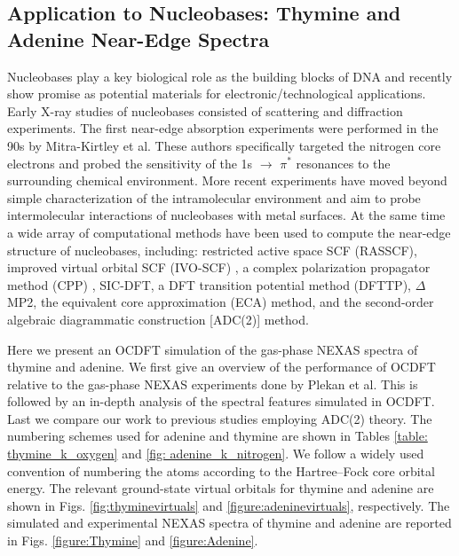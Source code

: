 \documentclass[12pt]{article}
\begin{document}
\subsection{Application to Nucleobases: Thymine and Adenine Near-Edge Spectra}
Nucleobases play a key biological role as the building blocks of DNA and recently show promise as potential materials for electronic/technological applications. \cite{di_mauro_dna_1993,niemeyer_dna_1997,niemeyer_nanoparticles_2001,song_nucleobase_2012} Early X-ray studies of nucleobases consisted of scattering and diffraction experiments.\cite{langridge_x-ray_1964,sundaralingam_structure_1975,camerman_photodimer_1968,davies_x-ray_1967} The first near-edge absorption experiments were performed in the 90s by Mitra-Kirtley et al.\cite{kirtley_nitrogen_1992} These authors specifically targeted the nitrogen  core electrons and probed the sensitivity of the 1s $\rightarrow$ $\pi^*$ resonances to the surrounding chemical environment. More recent experiments have moved beyond simple characterization of the intramolecular environment and aim to probe intermolecular interactions of nucleobases with metal surfaces.\cite{seifert_molecular_2007,yamada_adsorption_2004,fujii_x-ray_2003,fujii_near-edge_2004}  At the same time a wide array of computational methods have been used to compute the near-edge structure of nucleobases, including: restricted active space SCF (RASSCF),\cite{mochizuki_hf-stex_2001} improved virtual orbital SCF (IVO-SCF) \cite{macnaughton_electronic_2005}, a complex polarization propagator method (CPP) \cite{ekstrom_polarization_2006}, SIC-DFT,\cite{bolognesi_investigation_2009} a DFT transition potential method (DFTTP), \cite{macnaughton_electronic_2005} $\Delta$MP2,\cite{shim_calibration_2011} the equivalent core approximation (ECA) method,\cite{healion_probing_2008} and the second-order algebraic diagrammatic construction [ADC(2)] method.\cite{plekan_theoretical_2008,wenzel_calculating_2014}
  
Here we present an OCDFT simulation of the gas-phase NEXAS spectra of thymine and adenine. We first give an overview of the performance of OCDFT relative to the gas-phase NEXAS experiments done by Plekan et al. \cite{plekan_theoretical_2008} This is followed by an in-depth analysis of the spectral features simulated in OCDFT. Last we compare our work to previous studies employing ADC(2) theory. The numbering schemes used for adenine and thymine are shown in Tables \ref{table: thymine_k_oxygen} and \ref{fig: adenine_k_nitrogen}. We follow a widely used convention of numbering the atoms according to the Hartree--Fock core orbital energy. The relevant ground-state virtual orbitals for thymine and adenine are shown in Figs. \ref{fig:thyminevirtuals} and \ref{figure:adeninevirtuals}, respectively.  The simulated and experimental NEXAS spectra of thymine and adenine are reported in Figs. \ref{figure:Thymine} and \ref{figure:Adenine}.
\end{document}
